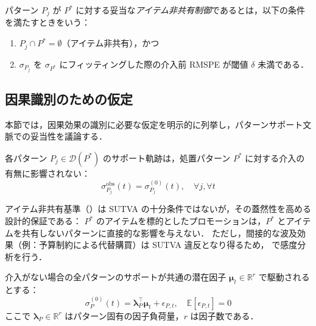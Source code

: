 \begin{definition}[アイテム非共有パターン制御]
\label{def:item-disjoint}
パターン $P_j$ が $P^*$ に対する妥当な\emph{アイテム非共有制御}であるとは，以下の条件を満たすときをいう：
\begin{enumerate}
    \item $P_j \cap P^* = \emptyset$（アイテム非共有），かつ
    \item $\sigma_{P_j}$ を $\sigma_{P^*}$ にフィッティングした際の介入前 RMSPE が閾値 $\delta$ 未満である．
\end{enumerate}
\end{definition}

\subsection{因果識別のための仮定}

本節では，因果効果の識別に必要な仮定を明示的に列挙し，パターンサポート文脈での妥当性を議論する．

\begin{definition}
\label{def:sutva}
各パターン $P_j \in \mathcal{D}(P^*)$ のサポート軌跡は，処置パターン $P^*$ に対する介入の有無に影響されない：
\begin{equation}
    \sigma_{P_j}^{\text{obs}}(t) = \sigma_{P_j}^{(0)}(t), \quad \forall j, \forall t
\end{equation}
\end{definition}

アイテム非共有基準（）は SUTVA の十分条件ではないが，その蓋然性を高める設計的保証である：
$P^*$ のアイテムを標的としたプロモーションは，$P^*$ とアイテムを共有しないパターンに直接的な影響を与えない．
ただし，間接的な波及効果（例：予算制約による代替購買）は SUTVA 違反となり得るため， で感度分析を行う．

\begin{definition}[線形因子モデル仮定]
\label{def:factor-model}
介入がない場合の全パターンのサポートが共通の潜在因子 $\boldsymbol{\mu}_t \in \mathbb{R}^r$ で駆動されるとする：
\begin{equation}
    \sigma_{P}^{(0)}(t) = \boldsymbol{\lambda}_P^\top \boldsymbol{\mu}_t + \epsilon_{P,t}, \quad \mathbb{E}[\epsilon_{P,t}] = 0
\end{equation}
ここで $\boldsymbol{\lambda}_P \in \mathbb{R}^r$ はパターン固有の因子負荷量，$r$ は因子数である．
\end{definition}

